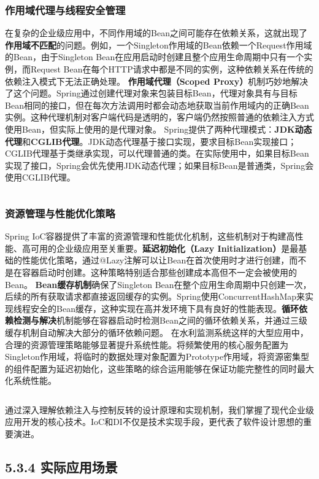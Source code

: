 \subsubsection{作用域代理与线程安全管理}\label{ux4f5cux7528ux57dfux4ee3ux7406ux4e0eux7ebfux7a0bux5b89ux5168ux7ba1ux7406}
在复杂的企业级应用中，不同作用域的Bean之间可能存在依赖关系，这就出现了\textbf{作用域不匹配}的问题。例如，一个Singleton作用域的Bean依赖一个Request作用域的Bean，由于Singleton
Bean在应用启动时创建且整个应用生命周期中只有一个实例，而Request Bean在每个HTTP请求中都是不同的实例，这种依赖关系在传统的依赖注入模式下无法正确处理。 \textbf{作用域代理（Scoped
Proxy）}机制巧妙地解决了这个问题。Spring通过创建代理对象来包装目标Bean，代理对象具有与目标Bean相同的接口，但在每次方法调用时都会动态地获取当前作用域内的正确Bean实例。这种代理机制对客户端代码是透明的，客户端仍然按照普通的依赖注入方式使用Bean，但实际上使用的是代理对象。
Spring提供了两种代理模式：\textbf{JDK动态代理}和\textbf{CGLIB代理}。JDK动态代理基于接口实现，要求目标Bean实现接口；CGLIB代理基于类继承实现，可以代理普通的类。在实际使用中，如果目标Bean实现了接口，Spring会优先使用JDK动态代理；如果目标Bean是普通类，Spring会使用CGLIB代理。
\begin{lstlisting}[language=Java] \end{lstlisting}
\subsubsection{资源管理与性能优化策略}\label{ux8d44ux6e90ux7ba1ux7406ux4e0eux6027ux80fdux4f18ux5316ux7b56ux7565} Spring
IoC容器提供了丰富的资源管理和性能优化机制，这些机制对于构建高性能、高可用的企业级应用至关重要。\textbf{延迟初始化（Lazy
Initialization）}是最基础的性能优化策略，通过@Lazy注解可以让Bean在首次使用时才进行创建，而不是在容器启动时创建。这种策略特别适合那些创建成本高但不一定会被使用的Bean。
\textbf{Bean缓存机制}确保了Singleton
Bean在整个应用生命周期中只创建一次，后续的所有获取请求都直接返回缓存的实例。Spring使用ConcurrentHashMap来实现线程安全的Bean缓存，这种实现在高并发环境下具有良好的性能表现。\textbf{循环依赖检测与解决}机制能够在容器启动时检测Bean之间的循环依赖关系，并通过三级缓存机制自动解决大部分的循环依赖问题。
在水利监测系统这样的大型应用中，合理的资源管理策略能够显著提升系统性能。将频繁使用的核心服务配置为Singleton作用域，将临时的数据处理对象配置为Prototype作用域，将资源密集型的组件配置为延迟初始化，这些策略的综合运用能够在保证功能完整性的同时最大化系统性能。
\begin{lstlisting}[language=Java] \end{lstlisting}
通过深入理解依赖注入与控制反转的设计原理和实现机制，我们掌握了现代企业级应用开发的核心技术。IoC和DI不仅是技术实现手段，更代表了软件设计思想的重要演进。 \subsection{5.3.4
实际应用场景}\label{ux5b9eux9645ux5e94ux7528ux573aux666f}
